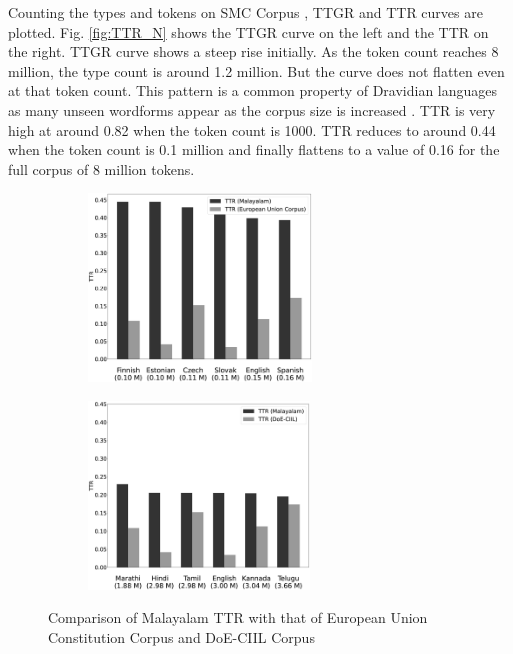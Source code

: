 Counting the types and tokens on SMC Corpus \cite{smctext}, TTGR and TTR curves are
plotted. Fig. \ref{fig:TTR_N} shows the TTGR curve on the left and the TTR on the
right. TTGR curve shows a steep rise initially. As the token count reaches 8
million, the type count is around 1.2 million. But the curve does not flatten
even at that token count. This pattern is a common property of Dravidian
languages as many unseen wordforms appear as the corpus size is increased
\cite{bharadwaja2007statistical}. TTR is very high at around 0.82 when the
token count is 1000. TTR reduces to around 0.44 when the token count is 0.1
million and finally flattens to a value of 0.16 for the full corpus of 8
million tokens.

\begin{figure}[ht]
	\begin{subfigure}{.5\textwidth}
		\centering
		\includegraphics[width=\linewidth, height=5cm]{tsd1030b.eps}
		\caption{}
		\label{fig:TTR_comparison1}
	\end{subfigure}
	\begin{subfigure}{.5\textwidth}
		\centering
		\includegraphics[width=\linewidth, height=5cm]{tsd1030c.eps}
		\caption{}
		\label{fig:TTR_comparison2}
	\end{subfigure}
	\caption{Comparison of Malayalam TTR with that of European Union Constitution Corpus  and DoE-CIIL Corpus}
	\label{fig:TTR_comparison}
\end{figure}

